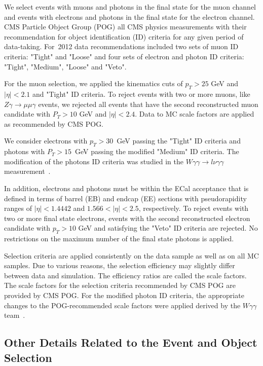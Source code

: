 We select events with muons and photons in the final state for the muon channel and events with electrons and photons in the final state for the electron channel. CMS Particle Object Group (POG) all CMS physics measurements with their recommendation for object identification (ID) criteria for any given period of data-taking. For~2012 data recommendations included two sets of muon ID criteria: "Tight" and "Loose" and four sets of electron and photon ID criteria: "Tight", "Medium", "Loose" and "Veto".

For the muon selection, we applied the kinematics cuts of $p_T>25$ GeV and $|\eta|<2.1$ and "Tight" ID criteria. To reject events with two or more muons, like $Z\gamma\rightarrow\mu\mu\gamma$ events, we rejected all events that have the second reconstructed muon candidate with $P_T>10$ GeV and $|\eta|<2.4$. Data to MC scale factors are applied as recommended by CMS POG.

We consider electrons with $p_T>30$~GeV passing the "Tight" ID criteria and photons with $P_T>15$~GeV passing the modified "Medium" ID criteria. The modification of the photons ID criteria was studied in the $W\gamma\gamma \rightarrow l\nu\gamma\gamma$ measurement~\cite{ref_Wgg8TeV}. 

In addition, electrons and photons must be within the ECal acceptance that is defined in terms of barrel (EB) and endcap (EE) sections with pseudorapidity ranges of $|\eta| < 1.4442$ and $1.566 < |\eta| < 2.5$, respectively. To reject events with two or more final state electrons, events with the second reconstructed electron candidate with $p_T>10$ GeV and satisfying the "Veto" ID criteria are rejected. No restrictions on the maximum number of the final state photons is applied. 

Selection criteria are applied consistently on the data sample as well as on all MC samples. Due to various reasons, the selection efficiency may slightly differ between data and simulation. The efficiency ratios are called the scale factors. The scale factors for the selection criteria recommended by CMS POG are provided by CMS POG. For the modified photon ID criteria, the appropriate changes to the POG-recommended scale factors were applied derived by the $W\gamma\gamma$ team~\cite{ref_Wgg8TeV}.


\subsection{Other Details Related to the Event and Object Selection}

